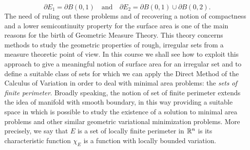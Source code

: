 \begin{equation*}
\partial E_{1} = \partial B(0, 1) \quad \text{and} \quad \partial E_{2} = \partial B(0, 1) \cup \partial B(0, 2).
\end{equation*} 
The need of ruling out these problems and of recovering a notion of compactness and a lower semicontinuity property for the surface area is one of the main reasons for the birth of Geometric Measure Theory. This theory concerns methods to study the geometric properties of rough, irregular sets from a measure theoretic point of view. In this course we shall see how to exploit this approach to give a meaningful notion of surface area for an irregular set and to define a suitable class of sets for which we can apply the Direct Method of the Calculus of Variation in order to deal with minimal area problems: the {\em sets of finite perimeter}. Broadly speaking, the notion of set of finite perimeter extends the idea of manifold with smooth boundary, in this way providing a suitable space in which is possible to study the existence of a solution to minimal area problems and other similar geometric variational minimization problems. More precisely, we say that $E$ is a set of locally finite perimeter in $\mathbb{R}^{n}$ is its characteristic function $\chi_{E}$ is a function with locally bounded variation.


